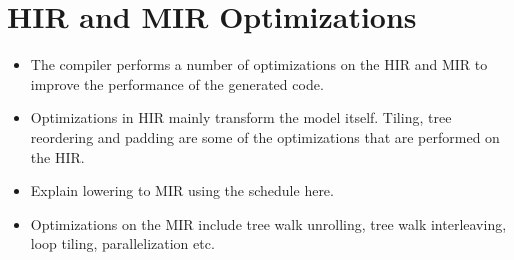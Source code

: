\section{HIR and MIR Optimizations}

\begin{itemize}
  \item The compiler performs a number of optimizations on the HIR and MIR to improve the performance of the generated code.
  \item Optimizations in HIR mainly transform the model itself. Tiling, tree reordering and padding are some of the 
  optimizations that are performed on the HIR. 
  \item Explain lowering to MIR using the schedule here.
  \item Optimizations on the MIR include tree walk unrolling, tree walk interleaving, loop tiling, parallelization etc.
\end{itemize}

